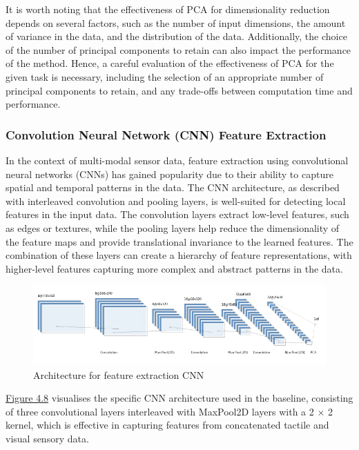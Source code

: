 \documentclass[11pt, a4paper]{report}
\begin{document}
It is worth noting that the effectiveness of PCA for dimensionality reduction depends on several factors, such as the number of input dimensions, the amount of variance in the data, and the distribution of the data. Additionally, the choice of the number of principal components to retain can also impact the performance of the method. Hence, a careful evaluation of the effectiveness of PCA for the given task is necessary, including the selection of an appropriate number of principal components to retain, and any trade-offs between computation time and performance.


\subsubsection{Convolution Neural Network (CNN) Feature Extraction}\label{sec:4.4.2.2}
In the context of multi-modal sensor data, feature extraction using convolutional neural networks (CNNs) has gained popularity due to their ability to capture spatial and temporal patterns in the data. The CNN architecture, as described with interleaved convolution and pooling layers, is well-suited for detecting local features in the input data. The convolution layers extract low-level features, such as edges or textures, while the pooling layers help reduce the dimensionality of the feature maps and provide translational invariance to the learned features. The combination of these layers can create a hierarchy of feature representations, with higher-level features capturing more complex and abstract patterns in the data.

\begin{figure}[H]
    \includegraphics[scale=0.7]{docs/Project Report/Media/4_4_2_nn.png}
    \caption{Architecture for feature extraction CNN}
    \label{fig:4.8}
\end{figure}

\hyperref[fig:4.8]{Figure 4.8} visualises the specific CNN architecture used in the baseline, consisting of three convolutional layers interleaved with MaxPool2D layers with a 2 × 2 kernel, which is effective in capturing features from concatenated tactile and visual sensory data. 
\end{document}
